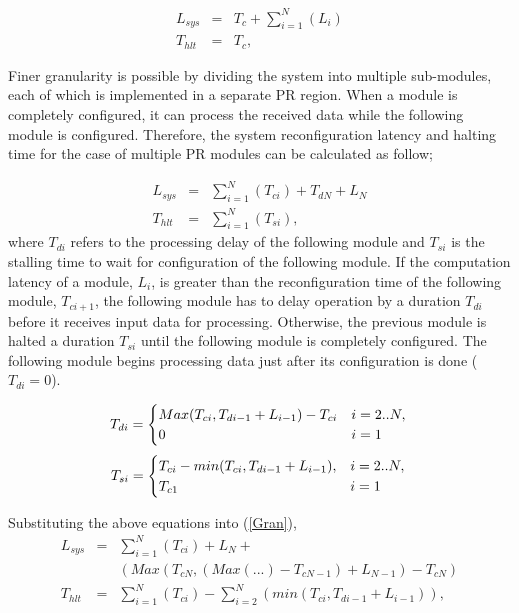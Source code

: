 \begin{eqnarray}
\label{Mono}
L_{sys} &=& T_{c} + \sum_{i = 1}^{N}    (L_{i}) \nonumber \\
T_{hlt} &=& T_{c},
\end{eqnarray}

Finer granularity is possible by dividing the system into multiple sub-modules, each of which is implemented in a separate PR region. When a module is completely configured, it can process the received data while the following module is configured. Therefore, the system reconfiguration latency and halting time for the case of multiple PR modules can be calculated as follow;

\begin{eqnarray}
\label{Gran}
L_{sys} &=&  \sum_{i = 1}^{N} (T_{ci}) + T_{dN} + L_{N} \nonumber \\
T_{hlt} &=&  \sum_{i = 1}^{N}  (T_{si}),
\end{eqnarray}
where $T_{di}$ refers to the processing delay of the following module and $T_{si}$ is the stalling time to wait for configuration of the following module. If the computation latency of a module, $L_{i}$, is greater than the reconfiguration time of the following module,  $T_{ci+1}$, the following module has to delay operation by a duration $T_{di}$ before it receives input data for processing. Otherwise, the previous module is halted a duration $T_{si}$ until the following module is completely configured. The following module begins processing data just after its configuration is done ($T_{di} = 0$).

\begin{equation}
\label{DelayTime}
T_{di} = \begin{cases} Max(T_{ci}, T_{di-1}+L_{i-1}) - T_{ci}  	& i = 2..N, \\
						0 										& i = 1 \end{cases}  \\
\end{equation}
\begin{equation}
\label{HaltTime}
T_{si} = \begin{cases} T_{ci} - min(T_{ci}, T_{di-1}+L_{i-1}), 	&  i = 2..N, \\
					  T_{c1}									&  i=1 \end{cases}  \\
\end{equation}

Substituting the above equations into (\ref{Gran}),
\begin{eqnarray}
\label{Gran2}
L_{sys} &= & \sum_{i = 1}^{N}(T_{ci}) + L_{N} +   \nonumber \\
		& & (Max(T_{cN}, (Max( ... ) - T_{cN-1}) + L_{N-1}) - T_{cN})  \nonumber \\
T_{hlt} &= &\sum_{i = 1}^{N}(T_{ci})  -  \sum_{i = 2}^{N}  (min(T_{ci}, T_{di-1}+L_{i-1})),
\end{eqnarray}

